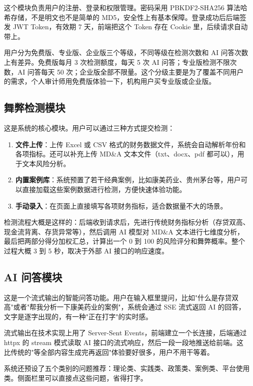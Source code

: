 \documentclass[12pt,a4paper]{ctexart}
\begin{document}
这个模块负责用户的注册、登录和权限管理。密码采用 PBKDF2-SHA256 算法哈希存储，不是明文也不是简单的 MD5，安全性上有基本保障。登录成功后后端签发 JWT Token，有效期 7 天，前端把这个 Token 存在 Cookie 里，后续请求自动带上。

用户分为免费版、专业版、企业版三个等级，不同等级在检测次数和 AI 问答次数上有差异。免费版每月 3 次检测额度，每天 5 次 AI 问答；专业版检测不限次数，AI 问答每天 50 次；企业版全部不限量。这个分级主要是为了覆盖不同用户的需求，个人审计师用免费版体验一下，机构用户买专业版或企业版。

\subsection{舞弊检测模块}

这是系统的核心模块。用户可以通过三种方式提交检测：

\begin{enumerate}
    \item \textbf{文件上传}：上传 Excel 或 CSV 格式的财务数据文件，系统会自动解析年份和各项指标。还可以补充上传 MD\&A 文本文件（txt、docx、pdf 都可以），用于文本风险分析。
    \item \textbf{内置案例库}：系统预置了若干经典案例，比如康美药业、贵州茅台等，用户可以直接加载这些案例数据进行检测，方便快速体验功能。
    \item \textbf{手动录入}：在页面上直接填写各项财务指标，适合数据量不大的场景。
\end{enumerate}

检测流程大概是这样的：后端收到请求后，先进行传统财务指标分析（存贷双高、现金流背离、存货异常等），然后调用 AI 模型对 MD\&A 文本进行七维度分析，最后把两部分得分加权汇总，计算出一个 0 到 100 的风险评分和舞弊概率。整个过程大概 3 到 5 秒，取决于外部 AI 接口的响应速度。

\subsection{AI 问答模块}

这是一个流式输出的智能问答功能。用户在输入框里提问，比如"什么是存贷双高"或者"帮我分析一下康美药业的案例"，系统会通过 SSE 流式返回 AI 的回答，文字是逐字出现的，有一种"正在打字"的实时感。

流式输出在技术实现上用了 Server-Sent Events，前端建立一个长连接，后端通过 httpx 的 stream 模式读取 AI 接口的流式响应，然后一段一段地推送给前端。这比传统的"等全部内容生成完再返回"体验要好很多，用户不用干等着。

系统还预设了五个类别的问题推荐：理论类、实践类、政策类、案例类、平台使用类。侧面栏里可以直接点这些问题，省得打字。
\end{document}
